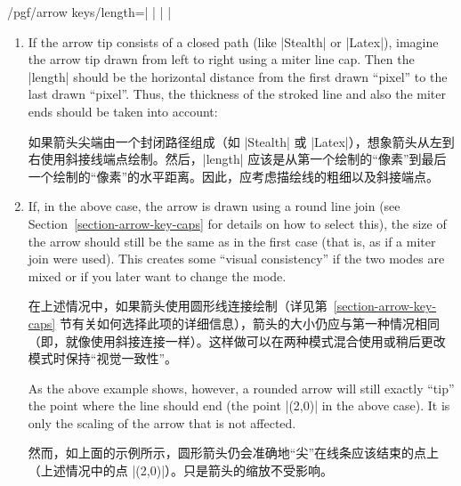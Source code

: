 \begin{key}{/pgf/arrow keys/length=| |%
        | |}
    \begin{enumerate}
        \item If the arrow tip consists of a closed path (like |Stealth| or
            |Latex|), imagine the arrow tip drawn from left to right using a
            miter line cap. Then the |length| should be the horizontal
            distance from the first drawn ``pixel'' to the last drawn
            ``pixel''. Thus, the thickness of the stroked line and also the
            miter ends should be taken into account:
            
            如果箭头尖端由一个封闭路径组成（如 |Stealth| 或 |Latex|），想象箭头从左到右使用斜接线端点绘制。然后，|length| 应该是从第一个绘制的“像素”到最后一个绘制的“像素”的水平距离。因此，应考虑描绘线的粗细以及斜接端点。

\begin{codeexample}[preamble={\usetikzlibrary{arrows.meta}}]
\end{codeexample}
        \item If, in the above case, the arrow is drawn using a round line
            join (see Section~\ref{section-arrow-key-caps} for details on how
            to select this), the size of the arrow should still be the same
            as in the first case (that is, as if a miter join were used).
            This creates some ``visual consistency'' if the two modes are
            mixed or if you later want to change the mode.
            
            在上述情况中，如果箭头使用圆形线连接绘制（详见第~\ref{section-arrow-key-caps} 节有关如何选择此项的详细信息），箭头的大小仍应与第一种情况相同（即，就像使用斜接连接一样）。这样做可以在两种模式混合使用或稍后更改模式时保持“视觉一致性”。

\begin{codeexample}[preamble={\usetikzlibrary{arrows.meta}}]
\end{codeexample}
            As the above example shows, however, a rounded arrow will still
            exactly ``tip'' the point where the line should end (the point
            |(2,0)| in the above case). It is only the scaling of the arrow
            that is not affected.

            然而，如上面的示例所示，圆形箭头仍会准确地“尖”在线条应该结束的点上（上述情况中的点 |(2,0)|）。只是箭头的缩放不受影响。
  \end{enumerate}
\end{key}

